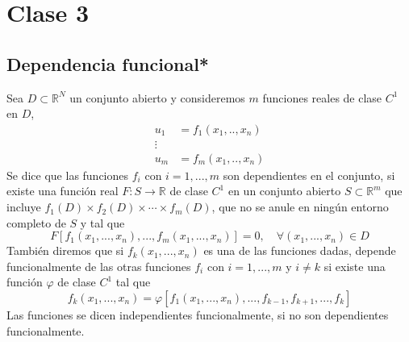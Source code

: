 \section{Clase 3}
\subsection{Dependencia funcional*}
Sea $D\subset  \mathbb{R}^N$ un conjunto abierto y consideremos $m$ funciones reales de clase $C^1$ en $D$,
\begin{align}
  u_1&=f_1(x_1,..,x_n)\\
  \vdots\\
  u_m&=f_m(x_1,..,x_n)
\end{align}
Se dice que las funciones $f_i$ con $i=1,...,m$ son dependientes en el conjunto, si existe una función real $F:S\rightarrow \mathbb{R}$ de clase $C^1$ en un conjunto abierto $S\subset  \mathbb{R}^m$ que incluye $f_1(D)\times f_2(D)\times \cdots \times f_m(D)$, que no se anule en ningún entorno completo de $S$ y tal que
\begin{equation}
  F[f_1(x_1,...,x_n),...,f_m(x_1,...,x_n)]=0, \quad \forall (x_1,...,x_n)\in D
\end{equation}
También diremos que si $f_k(x_1,...,x_n)$ es una de las funciones dadas, depende funcionalmente de las otras funciones $f_i$ con $i=1,...,m$ y $i\neq k$ si existe una función $\varphi$ de clase $C^1$ tal que
\begin{equation}
  f_k(x_1,...,x_n)=\varphi[f_1(x_1,...,x_n),...,f_{k-1},f_{k+1},...,f_k]
\end{equation}
Las funciones se dicen independientes funcionalmente, si no son dependientes funcionalmente.

